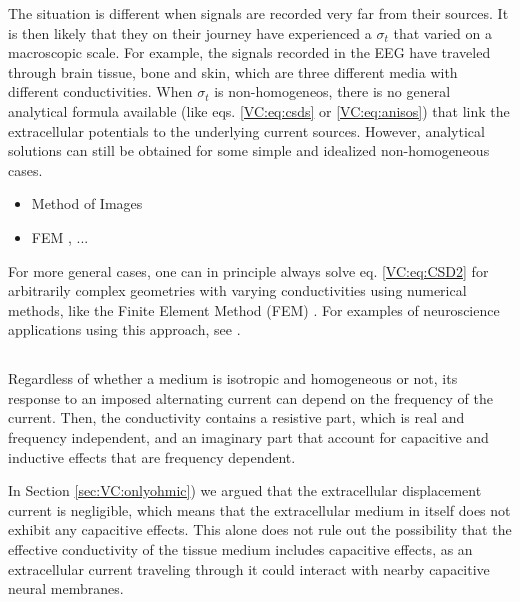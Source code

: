 The situation is different when signals are recorded very far from their sources. It is then likely that they on their journey have experienced a $\sigma_t$ that varied on a macroscopic scale. For example, the signals recorded in the EEG have traveled through brain tissue, bone and skin, which are three different media with different conductivities. When $\sigma_t$ is non-homogeneos, there is no general analytical formula available (like eqs. \ref{VC:eq:csds} or \ref{VC:eq:anisos}) that link the extracellular potentials to the underlying current sources. However, analytical solutions can still be obtained for some simple and idealized non-homogeneous cases. 

\begin{itemize}
\item Method of Images \citep{Ness2015}
\item FEM \citep{Ness2015}, ...
\end{itemize}

For more general cases, one can in principle always solve eq. \ref{VC:eq:CSD2} for arbitrarily complex geometries with varying conductivities using numerical methods, like the Finite Element Method (FEM) \citep{Logg2012}. For examples of neuroscience applications using this approach, see \citep{Moffitt2005, Frey2009, Joucla2012, Haufe2015, Ness2015, Buccino2019b, Obien2019}. 


\subsection{ }
\label{sec:Sigma:f-independent}

Regardless of whether a medium is isotropic and homogeneous or not, its response to an imposed alternating current can depend on the frequency of the current. Then, the conductivity contains a resistive part, which is real and frequency independent, and an imaginary part that account for capacitive and inductive effects that are frequency dependent. 

In Section \ref{sec:VC:onlyohmic}) we argued that the extracellular displacement current is negligible, which means that the extracellular medium in itself does not exhibit any capacitive effects. This alone does not rule out the possibility that the effective conductivity of the tissue medium includes capacitive effects, as an extracellular current traveling through it could interact with nearby capacitive neural membranes. 

